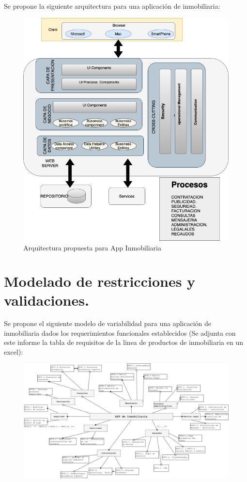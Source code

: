 \documentclass[letterpaper]{article}
\begin{document}
Se propone la siguiente arquitectura para una aplicación de inmobiliaria:

\begin{figure}[ht]
    \centering
    \includegraphics[width=5 in]{images/LPS.arqref.png}
    \caption{Arquitectura propuesta para App Inmobiliaria}
    \label{LPE}
\end{figure}
\FloatBarrier

\section{\textbf{Modelado de restricciones y validaciones.}}

Se propone el siguiente modelo de variabilidad para una aplicación de inmobiliaria dados los requerimientos funcionales establecidos (Se adjunta con este informe la tabla de requisitos de la linea de productos de inmobiliaria en un excel):
\begin{figure}[ht]
    \centering
    \includegraphics[width=6.8 in]{images/FM1.png}
    \label{LPE}
\end{figure}
\FloatBarrier
\end{document}
